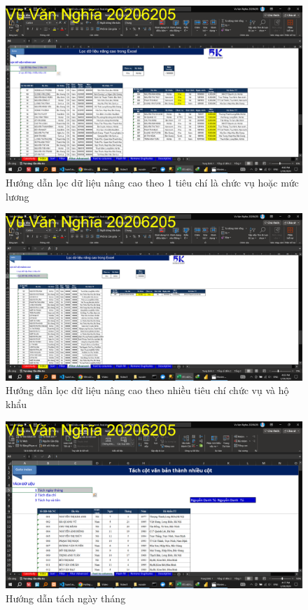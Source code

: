 \documentclass{article}
\begin{document}
\begin{figure}[H]
\centering
\includegraphics[scale = 0.15]{Video1/HuongDan/6.png}
\caption{Hướng dẫn lọc dữ liệu nâng cao theo 1 tiêu chí là chức vụ hoặc mức lương}
\end{figure}

\begin{figure}[H]
\centering
\includegraphics[scale = 0.15]{Video1/HuongDan/7.png}
\caption{Hướng dẫn lọc dữ liệu nâng cao theo nhiều tiêu chí chức vụ và hộ khẩu}
\end{figure}

\begin{figure}[H]
\centering
\includegraphics[scale = 0.15]{Video1/HuongDan/8.png}
\caption{Hướng dẫn tách ngày tháng}
\end{figure}
\end{document}
